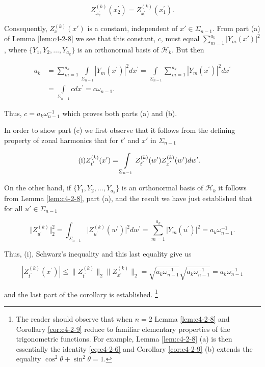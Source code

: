 \[
Z_{x_{2}^{\prime}}^{(k)}(x_{2}^{\prime})=Z_{x_{1}^{\prime}}^{(k)}(x_{1}^{\prime}).
\]

Consequently, $Z_x^{(k)}(x')$ is a constant, independent of $x' \in \Sigma_{n-1}$. From part (a) of Lemma \ref{lem:c4-2-8} we see that this constant, $c$, must equal $\sum_{m=1}^{a_k} |Y_m(x')|^2$, where $\{Y_1, Y_2, \ldots, Y_{a_k}\}$ is an orthonormal basis of $\mathcal{H}_k$. But then

\[
\begin{aligned}a_{k}&=\sum_{m=1}^{a_{k}}\int\limits_{\Sigma_{n-1}}|Y_{m}(x^{\prime})|^{2}dx^{\prime}=\int\limits_{\Sigma_{n-1}}\sum_{m=1}^{a_{k}}|Y_{m}(x^{\prime})|^{2}dx^{\prime}\\&=\int\limits_{\Sigma_{n-1}}c dx^{\prime}=c\omega_{n-1}.\end{aligned}
\]

Thus, $c = a_{k} \omega_{n-1}^{-1}$ which proves both parts (a) and (b).

In order to show part (c) we first observe that it follows from the defining property of zonal harmonics that for $t'$ and $x'$ in $\Sigma_{n-1}$

\begin{equation}
\tag{i}
Z_{t^{^{\prime}}}^{(k)}(x^{\prime})=\intop_{\Sigma_{n-1}}Z_{t^{^{\prime}}}^{(k)}(w^{\prime})Z_{x^{^{\prime}}}^{(k)}(w^{\prime})d w^{\prime}.
\end{equation}

On the other hand, if $\{Y_1, Y_2, \ldots, Y_{a_k}\}$ is an orthonormal basis of $\mathcal{H}_k$ it follows from Lemma \ref{lem:c4-2-8}, part (a), and the result we have just established that for all $u' \in \Sigma_{n-1}$

\[
\Vert Z_{u^{\prime}}^{(k)}\Vert_{2}^{2}=\int_{\Sigma_{n-1}}\vert Z_{u^{\prime}}^{(k)}(w^{\prime})\vert^{2}d w^{\prime}=\sum_{m=1}^{a_{k}}\vert Y_{m}(u^{\prime})\vert^{2}=a_{k}\omega_{n-1}^{-1}.
\]

Thus, (i), Schwarz's inequality and this last equality give us

\[
\left|Z_{t^{\prime}}^{(k)}(x^{\prime})\right|\leq\|Z_{t^{\prime}}^{(k)}\|_{2}\|Z_{x^{\prime}}^{(k)}\|_{2}=\sqrt{a_{k}\omega_{n-1}^{-1}}\sqrt{a_{k}\omega_{n-1}^{-1}}=a_{k}\omega_{n-1}^{-1}
\]

and the last part of the corollary is established. \footnote{The reader should observe that when $n = 2$ Lemma \ref{lem:c4-2-8} and Corollary \ref{cor:c4-2-9} reduce to familiar elementary properties of the trigonometric functions. For example, Lemma \ref{lem:c4-2-8} (a) is then essentially the identity \eqref{eq:c4-2-6} and Corollary \ref{cor:c4-2-9} (b) extends the equality $\cos^2 \theta + \sin^2 \theta = 1$.}

